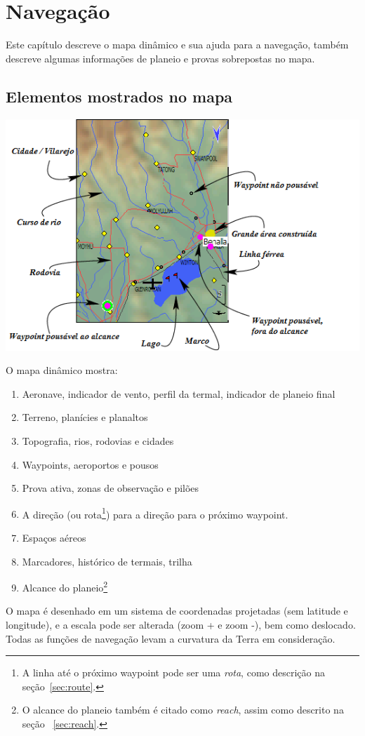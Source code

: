 \chapter{Navegação}\label{cha:navigation}
Este capítulo descreve o mapa dinâmico e sua ajuda para a navegação, também descreve algumas informações de planeio e provas sobrepostas no mapa.

\section{Elementos mostrados no mapa}

\begin{maxipage}
\includegraphics[angle=0,width=0.9\linewidth,keepaspectratio='true']{figures/fig-map.png}
\end{maxipage}

O mapa dinâmico mostra: 
\begin{enumerate} 
\item Aeronave, indicador de vento, perfil da termal, indicador de planeio final
\item Terreno, planícies e planaltos
\item Topografia, rios, rodovias e cidades
\item Waypoints, aeroportos e pousos
\item Prova ativa, zonas de observação e pilões
\item A direção (ou rota\footnote {A linha até o próximo waypoint pode ser uma {\em rota}, como descrição na seção~\ref{sec:route}.}) para a direção para o próximo waypoint.
\item Espaços aéreos
\item Marcadores, histórico de termais, trilha
\item Alcance do planeio\footnote{O alcance do planeio também é citado como
  {\em reach}, assim como descrito na seção ~\ref{sec:reach}.}
\end{enumerate}
O mapa é desenhado em um sistema de coordenadas projetadas (sem latitude e longitude), e a escala pode ser alterada (zoom + e zoom -), bem como deslocado.  Todas as funções de navegação levam a curvatura da Terra em consideração.

